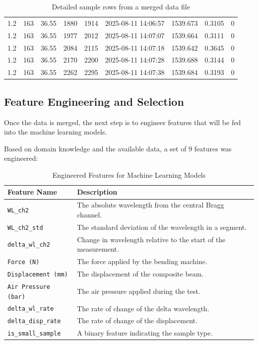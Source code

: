 \documentclass{article}
\begin{document}
\begin{table}[h!]
{\begin{tabular}{@{}lllllllll@{}}
1.2 & 163 & 36.55 & 1880 & 1914 & 2025-08-11 14:06:57 & 1539.673 & 0.3105 & 0 \\
1.2 & 163 & 36.55 & 1977 & 2012 & 2025-08-11 14:07:07 & 1539.664 & 0.3111 & 0 \\
1.2 & 163 & 36.55 & 2084 & 2115 & 2025-08-11 14:07:18 & 1539.642 & 0.3645 & 0 \\
1.2 & 163 & 36.55 & 2170 & 2200 & 2025-08-11 14:07:28 & 1539.688 & 0.3144 & 0 \\
1.2 & 163 & 36.55 & 2262 & 2295 & 2025-08-11 14:07:38 & 1539.684 & 0.3193 & 0 \\
\bottomrule
\end{tabular}%
}
\caption{Detailed sample rows from a merged data file}
\label{tab:sample_data}
\end{table}

\subsection{Feature Engineering and Selection}
Once the data is merged, the next step is to engineer features that will be fed into the machine learning models.

Based on domain knowledge and the available data, a set of 9 features was engineered:
\begin{table}[h!]
\centering
\begin{tabular}{@{}ll@{}}
\toprule
Feature Name & Description \\ \midrule
\texttt{WL\_ch2} & The absolute wavelength from the central Bragg channel. \\
\texttt{WL\_ch2\_std} & The standard deviation of the wavelength in a segment. \\
\texttt{delta\_wl\_ch2} & Change in wavelength relative to the start of the measurement. \\
\texttt{Force (N)} & The force applied by the bending machine. \\
\texttt{Displacement (mm)} & The displacement of the composite beam. \\
\texttt{Air Pressure (bar)} & The air pressure applied during the test. \\
\texttt{delta\_wl\_rate} & The rate of change of the delta wavelength. \\
\texttt{delta\_disp\_rate} & The rate of change of the displacement. \\
\texttt{is\_small\_sample} & A binary feature indicating the sample type. \\ \bottomrule
\end{tabular}
\caption{Engineered Features for Machine Learning Models}
\label{tab:features}
\end{table}
\end{document}

